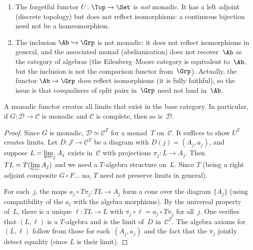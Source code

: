 \begin{example}\label{ex:non-monadic}
\begin{enumerate}[label=(\roman*)]
\item The forgetful functor $U\colon\Top\to\Set$ is \emph{not} monadic.
    It has a left adjoint (discrete topology) but does not reflect
    isomorphisms: a continuous bijection need not be a homeomorphism.

\item The inclusion $\Ab\hookrightarrow\Grp$ is not monadic:
    it does not reflect isomorphisms in general, and the associated
    monad (abelianisation) does not recover~$\Ab$ as the category of
    algebras (the Eilenberg--Moore category is equivalent to~$\Ab$,
    but the inclusion is not the comparison functor from~$\Grp$).
    Actually, the functor $\Ab\to\Grp$ does reflect isomorphisms
    (it is fully faithful), so the issue is that coequalisers of
    split pairs in~$\Grp$ need not land in~$\Ab$.
\end{enumerate}
\end{example}

\begin{proposition}\label{prop:monadic-creates-limits}
A monadic functor creates all limits that exist in the base category.
In particular, if $G\colon\mathcal{D}\to\mathcal{C}$ is monadic
and $\mathcal{C}$ is complete, then so is~$\mathcal{D}$.
\end{proposition}

\begin{proof}
Since $G$ is monadic, $\mathcal{D}\simeq\mathcal{C}^T$ for a
monad~$T$ on~$\mathcal{C}$.  It suffices to show $U^T$ creates limits.
Let $D\colon\mathcal{J}\to\mathcal{C}^T$ be a diagram with
$D(j) = (A_j,a_j)$, and suppose $L = \varprojlim_j A_j$ exists
in~$\mathcal{C}$ with projections $\pi_j\colon L\to A_j$.
Then $TL = T(\varprojlim A_j)$ and we need a $T$-algebra structure
on~$L$.  Since $T$ (being a right adjoint composite $G\circ F$... no,
$T$ need not preserve limits in general).

For each~$j$, the maps $a_j\circ T\pi_j\colon TL\to A_j$ form a cone
over the diagram $\{A_j\}$ (using compatibility of the $a_j$ with
the algebra morphisms).  By the universal property of~$L$, there is a
unique $\ell\colon TL\to L$ with $\pi_j\circ\ell = a_j\circ T\pi_j$
for all~$j$.  One verifies that $(L,\ell)$ is a $T$-algebra and is
the limit of~$D$ in~$\mathcal{C}^T$.  The algebra axioms for~$(L,\ell)$
follow from those for each~$(A_j,a_j)$ and the fact that the $\pi_j$
jointly detect equality (since $L$ is their limit).
\end{proof}


